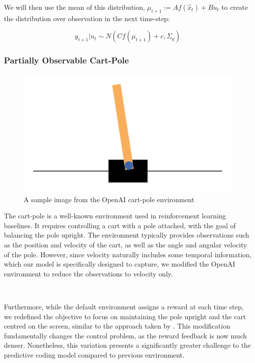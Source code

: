 \documentclass{article}
\begin{document}
We will then use the mean of this distribution, $\mu_{t+1} := A f(\hat{x}_{t}) + B u_{t}$ to create the distribution over observation in the next time-step:

\begin{equation}
	y_{t+1} | u_t \sim N( C f(\mu_{t+1}) + c, \Sigma_y)
\end{equation}

\subsubsection{Partially Observable Cart-Pole}

\begin{figure}[htbp]
    \centering
    \includegraphics[scale=1.5]{images/cart_pole.png}
    \caption{A sample image from the OpenAI cart-pole environment}
    \label{fig:cart_pole}
\end{figure}

The cart-pole is a well-known environment used in reinforcement learning baselines. It requires controlling a cart with a pole attached, with the goal of balancing the pole upright. The environment typically provides observations such as the position and velocity of the cart, as well as the angle and angular velocity of the pole. However, since velocity naturally includes some temporal information, which our model is specifically designed to capture, we modified the OpenAI \citep{towers2024gymnasium} environment to reduce the observations to velocity only.

\

Furthermore, while the default environment assigns a reward at each time step, we redefined the objective to focus on maintaining the pole upright and the cart centred on the screen, similar to the approach taken by \citet{millidge2019combining}. This modification fundamentally changes the control problem, as the reward feedback is now much denser. Nonetheless, this variation presents a significantly greater challenge to the predictive coding model compared to previous environment.
\end{document}
